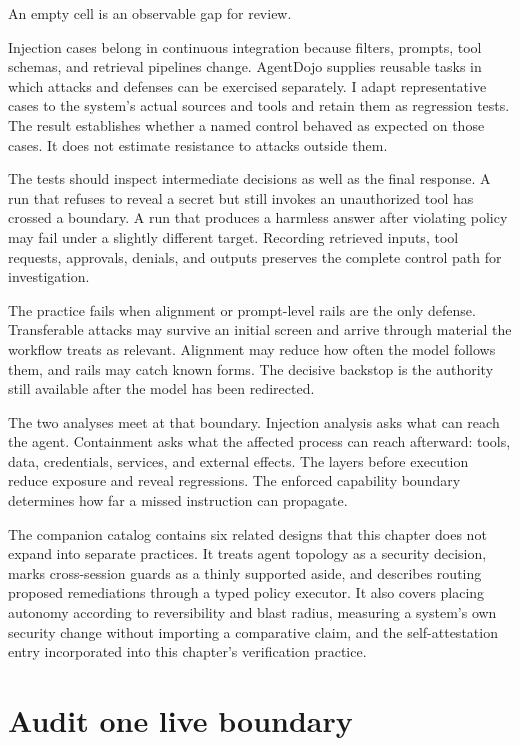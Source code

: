 An empty cell is an observable gap for review.

Injection cases belong in continuous integration because filters, prompts, tool schemas, and retrieval pipelines change. AgentDojo supplies reusable tasks in which attacks and defenses can be exercised separately. I adapt representative cases to the system's actual sources and tools and retain them as regression tests. The result establishes whether a named control behaved as expected on those cases. It does not estimate resistance to attacks outside them.

The tests should inspect intermediate decisions as well as the final response. A run that refuses to reveal a secret but still invokes an unauthorized tool has crossed a boundary. A run that produces a harmless answer after violating policy may fail under a slightly different target. Recording retrieved inputs, tool requests, approvals, denials, and outputs preserves the complete control path for investigation.

The practice fails when alignment or prompt-level rails are the only defense. Transferable attacks may survive an initial screen and arrive through material the workflow treats as relevant. Alignment may reduce how often the model follows them, and rails may catch known forms. The decisive backstop is the authority still available after the model has been redirected.

The two analyses meet at that boundary. Injection analysis asks what can reach the agent. Containment asks what the affected process can reach afterward: tools, data, credentials, services, and external effects. The layers before execution reduce exposure and reveal regressions. The enforced capability boundary determines how far a missed instruction can propagate.

The companion catalog contains six related designs that this chapter does not expand into separate practices. It treats agent topology as a security decision, marks cross-session guards as a thinly supported aside, and describes routing proposed remediations through a typed policy executor. It also covers placing autonomy according to reversibility and blast radius, measuring a system's own security change without importing a comparative claim, and the self-attestation entry incorporated into this chapter's verification practice.

\hypertarget{audit-one-live-boundary}{%
\section{Audit one live boundary}\label{audit-one-live-boundary}}

